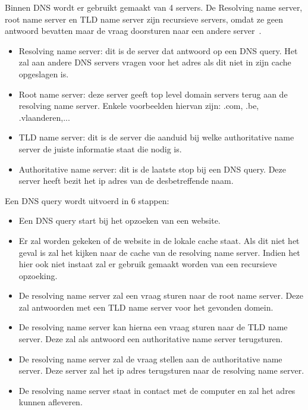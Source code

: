 Binnen DNS wordt er gebruikt gemaakt van 4 servers. De Resolving name server, root name server en TLD name server zijn recursieve servers, omdat ze geen antwoord bevatten maar de vraag doorsturen naar een andere server~\autocite{Petters2021}.
\begin{itemize}
    \item Resolving name server: dit is de server dat antwoord op een DNS query. Het zal aan andere DNS servers vragen voor het adres als dit niet in zijn cache opgeslagen is.
    \item Root name server: deze server geeft top level domain servers terug aan de resolving name server. Enkele voorbeelden hiervan zijn: .com, .be, .vlaanderen,...
    \item TLD name server: dit is de server die aanduid bij welke authoritative name server de juiste informatie staat die nodig is.
    \item Authoritative name server: dit is de laatste stop bij een DNS query. Deze server heeft bezit het ip adres van de desbetreffende naam.
\end{itemize} 


Een DNS query wordt uitvoerd in 6 stappen:
\begin{itemize}
    \item Een DNS query start bij het opzoeken van een website. 
    \item Er zal worden gekeken of de website in de lokale cache staat. Als dit niet het geval is zal het kijken naar de cache van de resolving name server. Indien het hier ook niet instaat zal er gebruik gemaakt worden van een recursieve opzoeking.
    \item De resolving name server zal een vraag sturen naar de root name server. Deze zal antwoorden met een TLD name server voor het gevonden domein.
    \item De resolving name server kan hierna een vraag sturen naar de TLD name server. Deze zal als antwoord een authoritative name server terugsturen.
    \item De resolving name server zal de vraag stellen aan de authoritative name server. Deze server zal het ip adres terugsturen naar de resolving name server.
    \item De resolving name server staat in contact met de computer en zal het adres kunnen afleveren. 
    \end{itemize}

